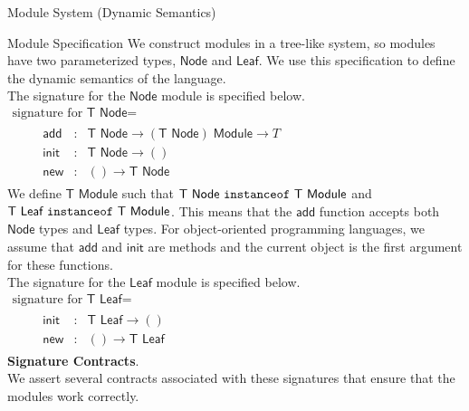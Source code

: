 \documentclass[11pt]{article}
\begin{document}
\begin{section}{Module System (Dynamic Semantics)}
\begin{subsection}{Module Specification}
We construct modules in a tree-like system, so modules have two parameterized types, $\textsf{Node}$ and $\textsf{Leaf}$. We use this specification to define the dynamic semantics of the language.\\

The signature for the $\textsf{Node}$ module is specified below. \\

\qquad $\begin{array}{l}
\mbox{signature for }\textsf{T Node} = \\
\qquad  \begin{array}{lcl}
\textsf{add} & : & \textsf{T Node} \rightarrow (\textsf{T Node})\; \textsf{Module} \rightarrow T\\
\textsf{init} & : & \textsf{T Node} \rightarrow ()\\
\textsf{new} & : & () \rightarrow \textsf{T Node}
\end{array}
\end{array}$\\

We define $\textsf{T Module}$ such that $\textsf{T Node }\verb|instanceof|\textsf{ T Module}$ and \\
$\textsf{T Leaf }\verb|instanceof|\textsf{ T Module}$. This means that the $\textsf{add}$ function accepts
both $\textsf{Node}$ types and $\textsf{Leaf}$ types. For object-oriented programming languages, we assume that $\textsf{add}$ and $\textsf{init}$ are methods and the current object is the first argument for these functions.\\

The signature for the $\textsf{Leaf}$ module is specified below. \\

\qquad $\begin{array}{l}
\mbox{signature for }\textsf{T Leaf} = \\
\qquad  \begin{array}{lcl}
\textsf{init} & : & \textsf{T Leaf} \rightarrow ()\\
\textsf{new} & : & () \rightarrow \textsf{T Leaf}
\end{array}
\end{array}$\\

\textbf{Signature Contracts}.\,\\
We assert several contracts associated with these signatures that ensure that the modules work correctly. \\


\end{subsection}
\end{section}
\end{document}
